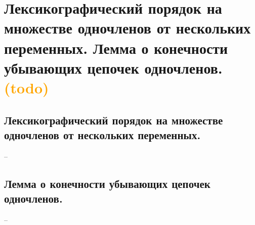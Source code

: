 \section{Лексикографический порядок на множестве одночленов от нескольких переменных. Лемма о конечности убывающих цепочек одночленов. \textcolor{orange}{(todo)}}

\subsection{Лексикографический порядок на множестве одночленов от нескольких переменных.}
--

\subsection{Лемма о конечности убывающих цепочек одночленов.}
--